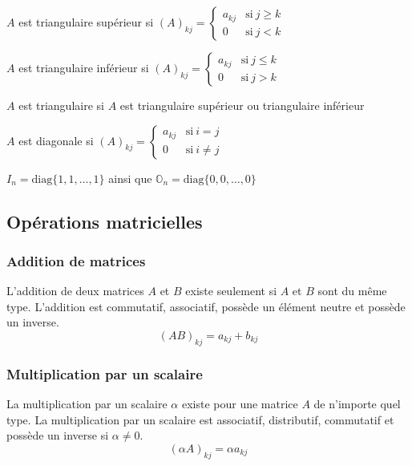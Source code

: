 \begin{definition}
    $A$ est triangulaire supérieur si $(A)_{kj} = \begin{cases}
            a_{kj} & \text{si} \ j \geq k \\
            0      & \text{si} \ j < k
        \end{cases}$
\end{definition}
\begin{definition}
    $A$ est triangulaire inférieur si $(A)_{kj} = \begin{cases}
            a_{kj} & \text{si} \ j \leq k \\
            0      & \text{si} \ j > k
        \end{cases}$
\end{definition}
\begin{remark}
    $A$ est triangulaire si $A$ est triangulaire supérieur ou triangulaire inférieur
\end{remark}
\begin{definition}
    $A$ est diagonale si $(A)_{kj} = \begin{cases}
            a_{kj} & \text{si} \ i = j    \\
            0      & \text{si} \ i \neq j
        \end{cases}$
    \begin{remark}
        $I_n = \text{diag}\{ 1, 1, \dots, 1 \}$ ainsi que $\mathbb{O}_n = \text{diag}\{ 0, 0, \dots, 0 \}$
    \end{remark}
\end{definition}


\subsection{Opérations matricielles}

\subsubsection{Addition de matrices}
L'addition de deux matrices $A$ et $B$ existe seulement si $A$ et $B$ sont du même type.
L'addition est commutatif, associatif, possède un élément neutre et possède un inverse.
\[ (AB)_{kj} = a_{kj} + b_{kj} \]

\subsubsection{Multiplication par un scalaire}
La multiplication par un scalaire $\alpha$ existe pour une matrice $A$ de n'importe quel type. La multiplication
par un scalaire est associatif, distributif, commutatif et possède un inverse si $\alpha \neq 0$.
\[ (\alpha A)_{kj} = \alpha a_{kj}\]

